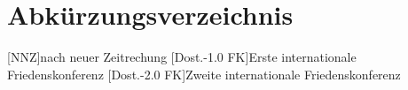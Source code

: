 \newpage
\thispagestyle{plain}
\chapter*{Abkürzungsverzeichnis}
\begin{acronym}
	[NNZ]{nach neuer Zeitrechung}
	[Dost.-1.0 FK]{Erste internationale Friedenskonferenz}
	[Dost.-2.0 FK]{Zweite internationale Friedenskonferenz}
\end{acronym}


